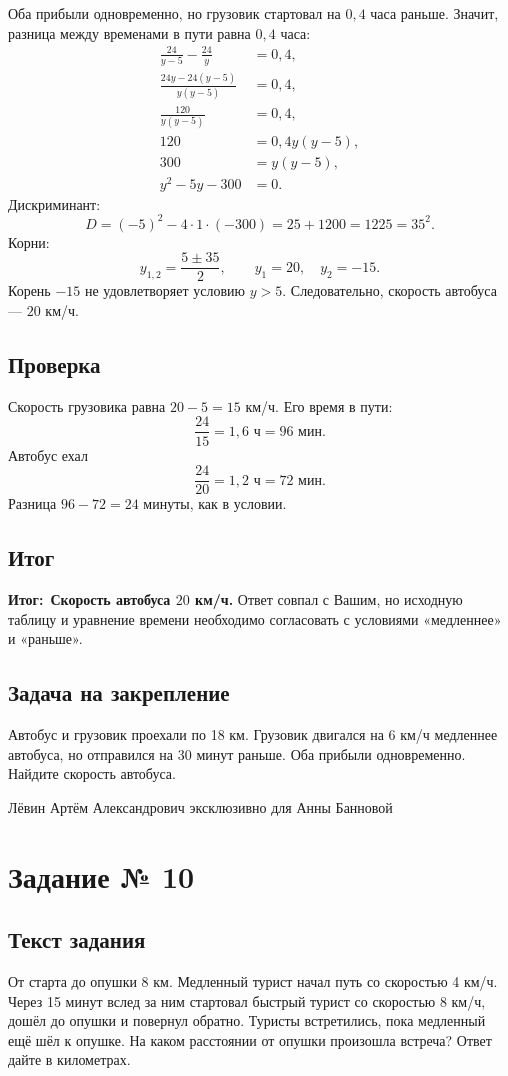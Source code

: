 \documentclass[a4paper,12pt]{article}
\newcommand{\resultlabel}{\textcolor{accent}{\textbf{Итог:}}}
\newcommand{\footerline}{%
  \par\vfill\begin{center}\small\color{muted}
  Лёвин Артём Александрович эксклюзивно для Анны Банновой
  \end{center}}
\begin{document}
Оба прибыли одновременно, но грузовик стартовал на $0{,}4$ часа раньше. Значит, разница между временами в пути равна $0{,}4$ часа:
\[
\begin{aligned}
\frac{24}{y-5}-\frac{24}{y}&=0{,}4,\\[2mm]
\frac{24y-24(y-5)}{y(y-5)}&=0{,}4,\\[2mm]
\frac{120}{y(y-5)}&=0{,}4,\\
120&=0{,}4y(y-5),\\
300&=y(y-5),\\
y^2-5y-300&=0.
\end{aligned}
\]
Дискриминант:
\[
D=(-5)^2-4\cdot1\cdot(-300)=25+1200=1225=35^2.
\]
Корни:
\[
y_{1,2}=\frac{5\pm35}{2},\qquad y_1=20,\quad y_2=-15.
\]
Корень $-15$ не удовлетворяет условию $y>5$. Следовательно, скорость автобуса --- $20$ км/ч.

\subsection*{Проверка}
Скорость грузовика равна $20-5=15$ км/ч. Его время в пути:
\[
\frac{24}{15}=1{,}6\text{ ч}=96\text{ мин}.
\]
Автобус ехал
\[
\frac{24}{20}=1{,}2\text{ ч}=72\text{ мин}.
\]
Разница $96-72=24$ минуты, как в условии.

\subsection*{Итог}
\resultlabel\ \textbf{Скорость автобуса $20$ км/ч.} Ответ совпал с Вашим, но исходную таблицу и уравнение времени необходимо согласовать с условиями «медленнее» и «раньше».

\subsection*{Задача на закрепление}
Автобус и грузовик проехали по 18 км. Грузовик двигался на 6 км/ч медленнее автобуса, но отправился на 30 минут раньше. Оба прибыли одновременно. Найдите скорость автобуса.

\footerline
\newpage

\label{task:10}
\section*{Задание № 10}
\subsection*{Текст задания}
От старта до опушки 8 км. Медленный турист начал путь со скоростью 4 км/ч. Через 15 минут вслед за ним стартовал быстрый турист со скоростью 8 км/ч, дошёл до опушки и повернул обратно. Туристы встретились, пока медленный ещё шёл к опушке. На каком расстоянии от опушки произошла встреча? Ответ дайте в километрах.
\end{document}
